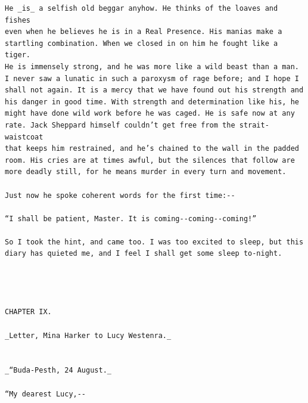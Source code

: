 \documentclass{article}
\begin{document}
\begin{verbatim}
He _is_ a selfish old beggar anyhow. He thinks of the loaves and fishes
even when he believes he is in a Real Presence. His manias make a
startling combination. When we closed in on him he fought like a tiger.
He is immensely strong, and he was more like a wild beast than a man.
I never saw a lunatic in such a paroxysm of rage before; and I hope I
shall not again. It is a mercy that we have found out his strength and
his danger in good time. With strength and determination like his, he
might have done wild work before he was caged. He is safe now at any
rate. Jack Sheppard himself couldn’t get free from the strait-waistcoat
that keeps him restrained, and he’s chained to the wall in the padded
room. His cries are at times awful, but the silences that follow are
more deadly still, for he means murder in every turn and movement.

Just now he spoke coherent words for the first time:--

“I shall be patient, Master. It is coming--coming--coming!”

So I took the hint, and came too. I was too excited to sleep, but this
diary has quieted me, and I feel I shall get some sleep to-night.




CHAPTER IX.

_Letter, Mina Harker to Lucy Westenra._


_“Buda-Pesth, 24 August._

“My dearest Lucy,--


\end{verbatim}
\end{document}

